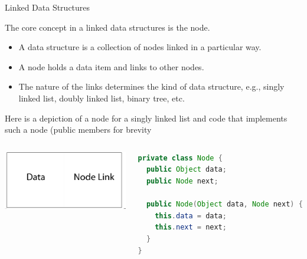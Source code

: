 \documentclass{beamer}
\begin{document}
\begin{frame}[fragile]{Linked Data Structures}

\vspace{-.1in}
The core concept in a  linked data structures is the node.

\begin{itemize}
\item A data structure is a collection of nodes linked in a particular way.
\item A node holds a data item and links to other nodes.
\item The nature of the links determines the kind of data structure, e.g., singly linked list, doubly linked list, binary tree, etc.
\end{itemize}

Here is a depiction of a node for a singly linked list and code that implements such a node (public members for brevity

\begin{columns}[t]
\begin{column}{2in}
\begin{center}
\includegraphics[height=1in]{node.png}
\end{center}
\end{column}
\begin{column}{2.75in}
\begin{lstlisting}[language=Java, frame=none]
private class Node {
  public Object data;
  public Node next;
  
  public Node(Object data, Node next) {
    this.data = data;
    this.next = next;
  }
}
\end{lstlisting}
\end{column}
\end{columns}


\end{frame}
\end{document}
